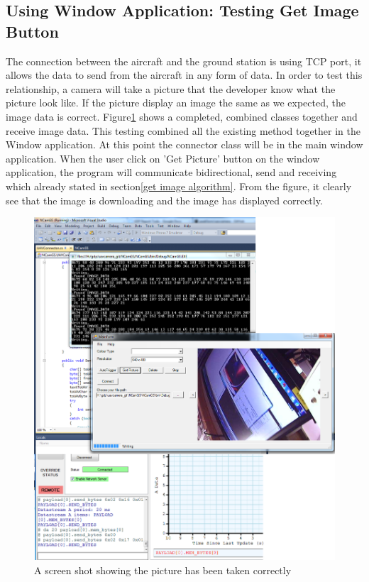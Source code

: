 \subsection{Using Window Application: Testing Get Image Button}
The connection between the aircraft and the ground station is using TCP port, it allows the data to send from the aircraft in any form of data. 
In order to test this relationship, a camera will take a picture that the developer know what the picture look like. 
If the picture display an image the same as we expected, the image data is correct.
Figure\ref{camera testing1} shows a completed, combined classes together and receive image data.
This testing combined all the existing method together in the Window application.
At this point the connector class will be in the main window application.
When the user click on 'Get Picture' button on the window application, the program will communicate bidirectional, send and receiving which already stated in section\ref{get image algorithm}. 
From the figure, it clearly see that the image is downloading and the image has displayed correctly.

\begin{figure}[H]
\begin{center}
\includegraphics[scale=0.5]{testing_screenshots/cam_test_11.png}   
\end{center}
\caption{A screen shot showing the picture has been taken correctly\label {camera testing1}}
\end{figure}

